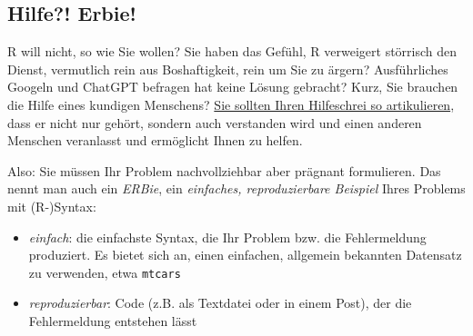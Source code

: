\documentclass[
  letterpaper,
  twoside,
  open=any]{scrbook}
\providecommand{\tightlist}{%
  \setlength{\itemsep}{0pt}\setlength{\parskip}{0pt}}\usepackage{longtable,booktabs,array}
\theoremstyle{definition}
\theoremstyle{definition}
\theoremstyle{definition}
\theoremstyle{remark}
\begin{document}
\subsection{Hilfe?! Erbie!}\label{sec-erbie}

R will nicht, so wie Sie wollen? Sie haben das Gefühl, R verweigert
störrisch den Dienst, vermutlich rein aus Boshaftigkeit, rein um Sie zu
ärgern? Ausführliches Googeln und ChatGPT befragen hat keine Lösung
gebracht? Kurz, Sie brauchen die Hilfe eines kundigen Menschens?
\href{https://data-se.netlify.app/2022/01/31/erbie-einfache-reproduzierbare-beispiele-ihres-problems-mit-r-syntax/}{Sie
sollten Ihren Hilfeschrei so artikulieren}, dass er nicht nur gehört,
sondern auch verstanden wird und einen anderen Menschen veranlasst und
ermöglicht Ihnen zu helfen.

Also: Sie müssen Ihr Problem nachvollziehbar aber prägnant formulieren.
Das nennt man auch ein \emph{ERBie}, ein \emph{einfaches,
reproduzierbare Beispiel} Ihres Problems mit (R-)Syntax:

\begin{itemize}
\tightlist
\item
  \emph{einfach}: die einfachste Syntax, die Ihr Problem bzw. die
  Fehlermeldung produziert. Es bietet sich an, einen einfachen,
  allgemein bekannten Datensatz zu verwenden, etwa \texttt{mtcars}
\item
  \emph{reproduzierbar}: Code (z.B. als Textdatei oder in einem Post),
  der die Fehlermeldung entstehen lässt
\end{itemize}
\end{document}
